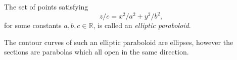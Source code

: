 \documentclass{ximera}
\begin{document}
\begin{example}
The set of points satisfying
\[
z/c = x^2/a^2 + y^2/b^2,
\]
for some constants $a,b,c\in\mathbb{R}$, is called an \emph{elliptic paraboloid}.

\begin{image}
\end{image}

The contour curves of such an elliptic paraboloid are ellipses, however the sections are parabolas which all open in the same direction.
\end{example}
\end{document}
